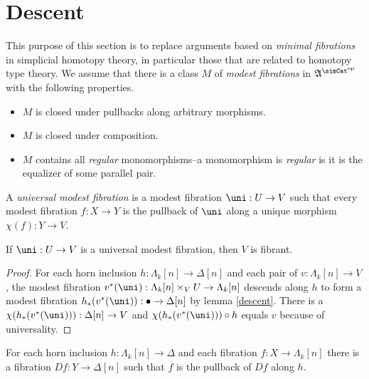 \documentclass{tac}
\newcommand\hide[1]{}
\newcommand\ri{^*}
\newcommand\dual{^{\mathrm{op}}}
\newcommand\s{^{\simCat\dual}}
\newcommand\of{:}
\newcommand\simplex\Delta
\newcommand\horn\Lambda
\newcommand\ambient{\mathfrak A}
\begin{document}
\hide{ Idea: class of fibrations with a generic fibration and certain closure properties (limits) results in a fibrant codomain. }
\section{Descent} 
This purpose of this section is to replace arguments based on \emph{minimal fibrations} in simplicial homotopy theory, in particular those that are related to homotopy type theory. We assume that there is a class $M$ of \emph{modest fibrations} in $\ambient\s$ with the following properties.
\begin{itemize}
\item $M$ is closed under pullbacks along arbitrary morphisms.
\item $M$ is closed under composition.
\item $M$ contains all \emph{regular} monomorphisms--a monomorphism is \emph{regular} is it is the equalizer of some parallel pair.
\end{itemize} 

\newcommand\chm\chi
\begin{definition} A \emph{universal modest fibration} is a modest fibration $\uni\of U\to V$ such that every modest fibration $f\of X\to Y$ is the pullback of $\uni$ along a unique morphism $\chm(f)\of Y\to V$.
\end{definition}


\begin{theorem} If $\uni\of U\to V$ is a universal modest fibration, then $V$ is fibrant.
\end{theorem}


\begin{proof} For each horn inclusion $h\of \horn_k[n]\to\simplex[n]$ and each pair of $v\of \horn_k[n]\to V$, the modest fibration $v\ri(\uni)\of \horn_k[n]\times_V U \to \horn_k[n]$ descends along $h$ to form a modest fibration $h_*(v\ri(\uni))\of \bullet\to\simplex[n]$ by lemma \ref{descent}. There is a $\chm(h_*(v\ri(\uni)))\of\simplex[n]\to V$ and $\chm(h_*(v\ri(\uni)))\circ h$ equals $v$ because of universality.
\end{proof}

\begin{lemma}[Descent]
For each horn inclusion $h\of \horn_k[n]\to\simplex$ and each fibration $f\of X\to \horn_k[n]$ there is a fibration $Df\of Y\to\simplex[n]$ such that $f$ is the pullback of $Df$ along $h$.
\label{descent}
\end{lemma}
\end{document}
